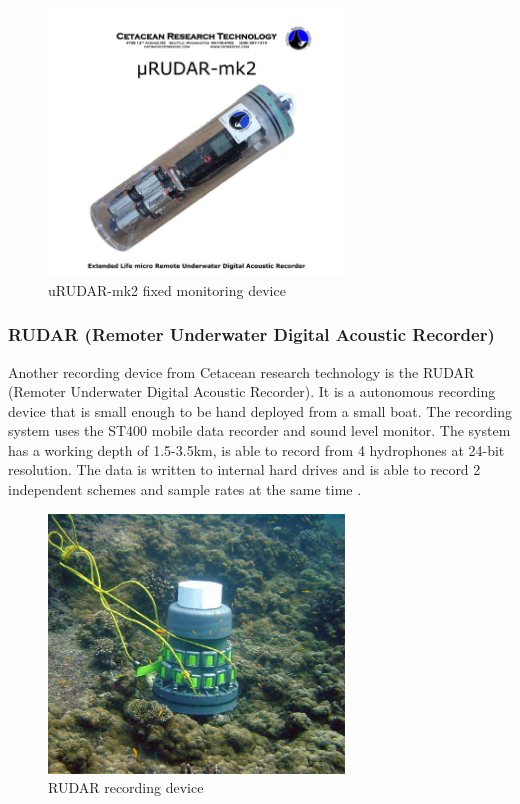 \begin{figure}[h]
    \centering
    \includegraphics[width=0.70\textwidth]{graphics/uRUDAR-mk2.jpg}
    \caption{uRUDAR-mk2 fixed monitoring device\cite{computing_microrudar_nodate}}
    \label{fig:uRUDAR}
\end{figure}

\subsubsection{RUDAR (Remoter Underwater Digital Acoustic Recorder)}
Another recording device from Cetacean research technology is the RUDAR (Remoter Underwater Digital Acoustic Recorder). 
It is a autonomous recording device that is small enough to be hand deployed from a small boat.
The recording system uses the ST400 mobile data recorder and sound level monitor. 
The system has a working depth of 1.5-3.5km, is able to record from 4 hydrophones at 24-bit resolution.
The data is written to internal hard drives and is able to record 2 independent schemes and sample rates at the same time \cite{cetacean_research_technology_rudar_2021}.

\begin{figure}[h]
    \centering
    \includegraphics[width=0.70\textwidth]{graphics/Rudar.jpg}
    \caption{RUDAR recording device \cite{cetacean_research_technology_rudar_2021}}
    \label{fig:Rudar}
\end{figure}

